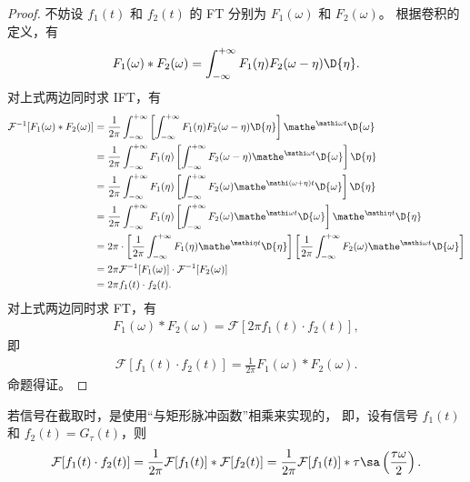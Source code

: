 \begin{proof}
    不妨设 $f_1(t)$ 和 $f_2(t)$ 的 FT 分别为 $F_1(\omega)$ 和 $F_2(\omega)$。
    根据卷积的定义，有
    \begin{align*}
        F_1(\omega) * F_2(\omega) = \int_{-\infty}^{+\infty} F_1(\eta)F_2(\omega - \eta)\D{\eta}.
    \end{align*}
    对上式两边同时求 IFT，有
    \begin{align*}
        \mathcal{F}^{-1}[F_1(\omega) * F_2(\omega)] & = \frac{1}{2\pi}\int_{-\infty}^{+\infty} \left[\int_{-\infty}^{+\infty} F_1(\eta)F_2(\omega - \eta)\D{\eta}\right]\mathe^{\mathi\omega t}\D{\omega} \\
        & = \frac{1}{2\pi}\int_{-\infty}^{+\infty} F_1(\eta)\left[\int_{-\infty}^{+\infty} F_2(\omega - \eta)\mathe^{\mathi\omega t}\D{\omega}\right]\D{\eta} \\
        & = \frac{1}{2\pi}\int_{-\infty}^{+\infty} F_1(\eta)\left[\int_{-\infty}^{+\infty} F_2(\omega)\mathe^{\mathi(\omega + \eta)t}\D{\omega}\right]\D{\eta} \\
        & = \frac{1}{2\pi}\int_{-\infty}^{+\infty} F_1(\eta)\left[\int_{-\infty}^{+\infty} F_2(\omega)\mathe^{\mathi\omega t}\D{\omega}\right]\mathe^{\mathi\eta t}\D{\eta} \\
        & = 2\pi\cdot\left[\frac{1}{2\pi}\int_{-\infty}^{+\infty} F_1(\eta)\mathe^{\mathi\eta t}\D{\eta}\right]\left[\frac{1}{2\pi}\int_{-\infty}^{+\infty} F_2(\omega)\mathe^{\mathi\omega t}\D{\omega}\right] \\
        & = 2\pi \mathcal{F}^{-1}[F_1(\omega)] \cdot \mathcal{F}^{-1}[F_2(\omega)] \\
        & = 2\pi f_1(t) \cdot f_2(t).
    \end{align*}
    对上式两边同时求 FT，有
    \begin{align*}
        F_1(\omega) * F_2(\omega) = \mathcal{F}[2\pi f_1(t) \cdot f_2(t)],
    \end{align*}
    即
    \begin{align*}
        \mathcal{F}[f_1(t) \cdot f_2(t)] = \frac{1}{2\pi}F_1(\omega) * F_2(\omega).
    \end{align*}
    命题得证。
\end{proof}

\begin{example}
    若信号在截取时，是使用``与矩形脉冲函数''相乘来实现的，
    即，设有信号 $f_1(t)$ 和 $f_2(t) = G_{\tau}(t)$，则
    \begin{align*}
        \mathcal{F}[f_1(t) \cdot f_2(t)] = \frac{1}{2\pi}\mathcal{F}[f_1(t)] * \mathcal{F}[f_2(t)] = \frac{1}{2\pi}\mathcal{F}[f_1(t)] * \tau\sa\left(\frac{\tau\omega}{2}\right).
    \end{align*}
\end{example}

